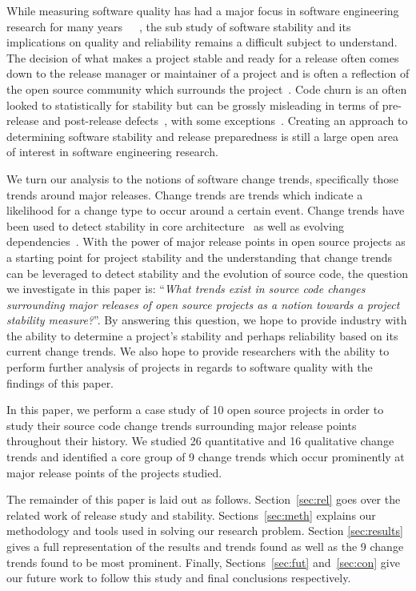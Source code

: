 \documentclass[conference]{IEEEtran}
\begin{document}
While measuring software quality has had a major focus in software engineering research for many years~\cite{Bowen:1978:CAS}~\cite{Grady:1993:PRM}~\cite{ISOIEC9126},
the sub study of software stability and its implications on quality and reliability remains a difficult subject to understand. 
The decision of what makes a project stable and ready
for a release often comes down to the release manager or maintainer of a project and is often a reflection of the open source community which surrounds 
the project~\cite{Conway:1968}. Code churn is an often looked to statistically for stability but can be grossly misleading
in terms of pre-release and post-release defects~\cite{Fenton:2000:QAF}, with some exceptions~\cite{Nagappan:2005:URC}. 
Creating an approach to determining software stability and release preparedness is still a large open area of
interest in software engineering research.

We turn our analysis to the notions of software change trends, specifically those trends around major releases. Change trends are trends which indicate
a likelihood for a change type to occur around a certain event. Change trends have been used to detect
stability in core architecture~\cite{Wermelinger:2008:AEE} as well as evolving dependencies~\cite{Businge:2010:ESE}.
With the power of major release points in open source projects as a starting point for project stability and the understanding that change trends can
be leveraged to detect stability and the evolution of source code, the question we investigate in this paper is:
``\textit{What trends exist in source code changes surrounding major releases of open source projects as a notion towards a project
stability measure?}''. By answering this question, we hope to provide industry with the ability to determine a project's stability and perhaps
reliability based on its current change trends. We also hope to provide researchers with the ability to perform further analysis of projects in
regards to software quality with the findings of this paper.

In this paper, we perform a case study of 10 open source projects in order to study their source code change trends surrounding major release points
throughout their history. We studied 26 quantitative and 16 qualitative change trends and identified a core group of 9 change trends which occur
prominently at major release points of the projects studied.

The remainder of this paper is laid out as follows. Section~\ref{sec:rel} goes over the related work of release study and stability. Sections~\ref{sec:meth}
explains our methodology and tools used in solving our research problem.
Section \ref{sec:results} gives a full representation of the results and trends found as well as the 9 change trends found
to be most prominent. Finally, Sections~\ref{sec:fut} and~\ref{sec:con} give our future work to follow this study and final conclusions respectively.
\end{document}

